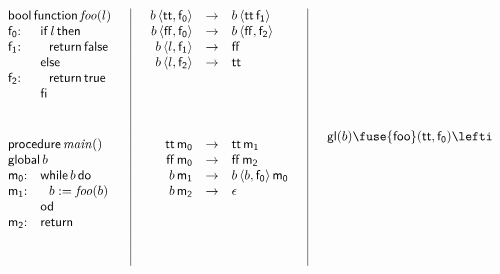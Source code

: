 \begin{figure}
\[
\begin{array}{ll}
\multicolumn{2}{l}
{{\sf bool}\,{\sf function}\,{\it foo}(l)}\\
{\sf f_0}{:} & {\sf if}\,l\,{\sf then}\\
{\sf f_1}{:} & ~~ {\sf return}\,{\sf false}\\
       & {\sf else}\\
{\sf f_2}{:} & ~~ {\sf return}\,{\sf true}\\
       & {\sf fi}\\[15pt]
\\
\multicolumn{2}{l}
{{\sf procedure}\,{\it main}()}\\
\multicolumn{2}{l}
{{\sf global}\,b}\\
{\sf m_0}{:} & {\sf while}\,b\,{\sf do}\\
{\sf m_1}{:} & ~~ b := {\it foo}(b)\\
       & {\sf od}\\
{\sf m_2}{:} & {\sf return}\\[15pt]
\\
\end{array}
\quad
\begin{array}{|rcl|}
\quad b\,\langle {\sf tt}, {\sf f_0} \rangle 
  & \rightarrow & b\,\langle {\sf tt}\,{\sf f_1} \rangle\\
b\,\langle {\sf ff}, {\sf f_0} \rangle
  & \rightarrow & b\,\langle {\sf ff},{\sf f_2} \rangle\\
b\,\langle l, {\sf f_1} \rangle 
  & \rightarrow & {\sf ff}\\
b\,\langle l, {\sf f_2} \rangle 
  & \rightarrow & {\sf tt}\\
  & & \\[15pt]
  & & \\
  & & \\
{\sf tt}\,{\sf m_0} 
  & \rightarrow & {\sf tt}\,{\sf m_1}\\
{\sf ff}\,{\sf m_0} 
  & \rightarrow & {\sf ff}\,{\sf m_2}\\
b\,{\sf m_1} 
  & \rightarrow & b\,\langle b, {\sf f_0} \rangle\,{\sf m_0}  \quad\\
b\,{\sf m_2}
  & \rightarrow & \epsilon\\
  & &\\[15pt]
  & &\\
  & &\\
\end{array}
\quad 
\begin{array}{l}
{\sf gl}(b) \fuse {\sf foo}({\sf tt}, {\sf f_0}) \lefti ~\\

\end{array}\]
\end{figure}

